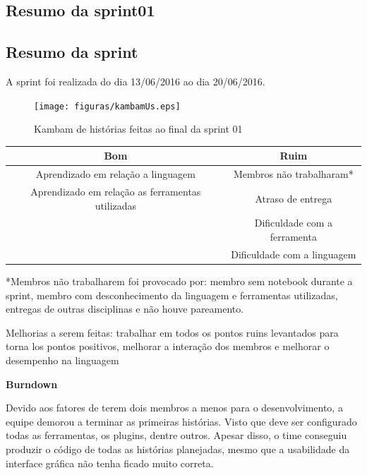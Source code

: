 \begin{anexosenv}
\chapter[Resumo da sprint01]{Resumo da sprint01}\label{resumoSprint}

\section{Resumo da sprint}

A sprint foi realizada do dia 13/06/2016 ao dia 20/06/2016.

\begin{figure}
    \centering
    \texttt{[image: figuras/kambamUs.eps]}
    \caption[Kambam de US]{Kambam de histórias feitas ao final da sprint 01}
\end{figure}

\begin{table}
    \centering
    \begin{tabular}{|c|c|}
        \hline
        Bom & Ruim\\
        \hline
        Aprendizado em relação a linguagem & Membros não trabalharam* \\
        Aprendizado em relação as ferramentas utilizadas & Atraso de entrega \\
        & Dificuldade com a ferramenta\\
        & Dificuldade com a linguagem\\
        \hline
    \end{tabular}
\end{table}
*Membros não trabalharem foi provocado por:  membro sem notebook durante a sprint, membro com desconhecimento da linguagem e ferramentas utilizadas, entregas de outras disciplinas e não houve pareamento.

\indent Melhorias a serem feitas: trabalhar em todos os pontos ruins levantados para torna los pontos positivos, melhorar a interação dos membros e melhorar o desempenho na linguagem

\textbf{Burndown}

Devido aos fatores de terem dois membros a menos para o desenvolvimento, a equipe demorou a terminar as primeiras histórias. Visto que deve ser configurado todas as ferramentas, os plugins, dentre outros. Apesar disso, o time conseguiu produzir o código de todas as histórias planejadas, mesmo que a usabilidade da interface gráfica não tenha ficado muito correta.


\end{anexosenv}

